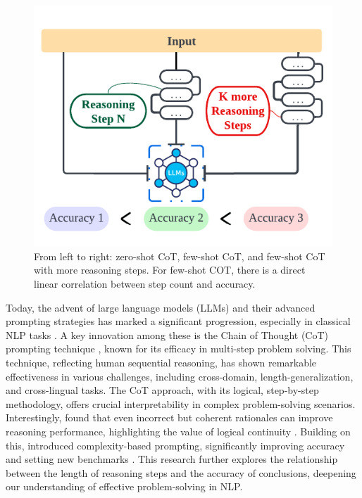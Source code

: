 \documentclass[11pt]{article}
\begin{document}
\begin{figure}[t]
    \centering
    \includegraphics[width=0.9\columnwidth]{add.pdf}

    \caption{From left to right: zero-shot CoT, few-shot CoT, and few-shot CoT with more reasoning steps. For few-shot COT, there is a direct linear correlation between step count and accuracy.}
    \label{fig:steps-connection-with-accuracy}

\end{figure}

Today, the advent of large language models (LLMs) and their advanced prompting strategies has marked a significant progression, especially in classical NLP tasks \cite{kojima2023large,wei2022chain,shao2023synthetic,lyu2023faithful, jin2024exploring}. A key innovation among these is the Chain of Thought (CoT) prompting technique \cite{kojima2023large,wang2023selfconsistency,zhang2022automatic}, known for its efficacy in multi-step problem solving. This technique, reflecting human sequential reasoning, has shown remarkable effectiveness in various challenges, including cross-domain, length-generalization, and cross-lingual tasks. The CoT approach, with its logical, step-by-step methodology, offers crucial interpretability in complex problem-solving scenarios. Interestingly, \citeauthor{wang2023selfconsistency} found that even incorrect but coherent rationales can improve reasoning performance, highlighting the value of logical continuity \cite{wang2023selfconsistency}. Building on this, \citeauthor{fu2023complexitybased} introduced complexity-based prompting, significantly improving accuracy and setting new benchmarks \cite{fu2023complexitybased}. This research further explores the relationship between the length of reasoning steps and the accuracy of conclusions, deepening our understanding of effective problem-solving in NLP.
\end{document}
